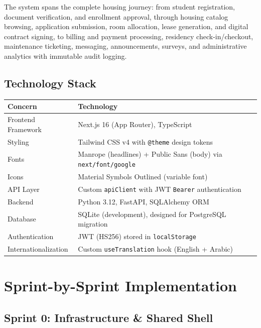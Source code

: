 \documentclass[12pt,a4paper]{article}
\begin{document}
The system spans the complete housing journey: from student registration, document verification, and enrollment approval, through housing catalog browsing, application submission, room allocation, lease generation, and digital contract signing, to billing and payment processing, residency check-in/checkout, maintenance ticketing, messaging, announcements, surveys, and administrative analytics with immutable audit logging.

\subsection{Technology Stack}

\begin{longtable}{p{4cm}p{9cm}}
\toprule
\textbf{Concern} & \textbf{Technology} \\
\midrule
Frontend Framework & Next.js 16 (App Router), TypeScript \\
Styling & Tailwind CSS v4 with \texttt{@theme} design tokens \\
Fonts & Manrope (headlines) + Public Sans (body) via \texttt{next/font/google} \\
Icons & Material Symbols Outlined (variable font) \\
API Layer & Custom \texttt{apiClient} with JWT \texttt{Bearer} authentication \\
Backend & Python 3.12, FastAPI, SQLAlchemy ORM \\
Database & SQLite (development), designed for PostgreSQL migration \\
Authentication & JWT (HS256) stored in \texttt{localStorage} \\
Internationalization & Custom \texttt{useTranslation} hook (English + Arabic) \\
\bottomrule
\end{longtable}


\section{Sprint-by-Sprint Implementation}


\subsection{Sprint 0: Infrastructure \& Shared Shell}
\end{document}
